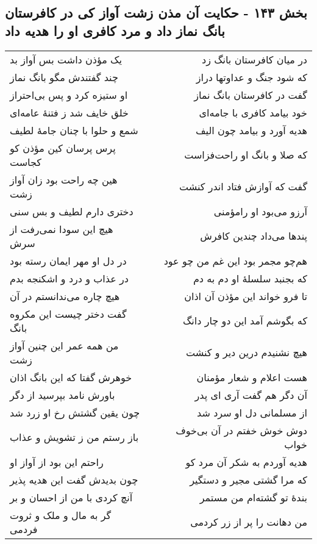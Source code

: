 \begin{center}
\section*{بخش ۱۴۳ - حکایت آن مذن زشت آواز کی در کافرستان بانگ نماز داد و مرد کافری او را هدیه داد}
\label{sec:sh143}
\begin{longtable}{l p{0.5cm} r}
یک مؤذن داشت بس آواز بد
&&
در میان کافرستان بانگ زد
\\
چند گفتندش مگو بانگ نماز
&&
که شود جنگ و عداوتها دراز
\\
او ستیزه کرد و پس بی‌احتراز
&&
گفت در کافرستان بانگ نماز
\\
خلق خایف شد ز فتنهٔ عامه‌ای
&&
خود بیامد کافری با جامه‌ای
\\
شمع و حلوا با چنان جامهٔ لطیف
&&
هدیه آورد و بیامد چون الیف
\\
پرس پرسان کین مؤذن کو کجاست
&&
که صلا و بانگ او راحت‌فزاست
\\
هین چه راحت بود زان آواز زشت
&&
گفت که آوازش فتاد اندر کنشت
\\
دختری دارم لطیف و بس سنی
&&
آرزو می‌بود او رامؤمنی
\\
هیچ این سودا نمی‌رفت از سرش
&&
پندها می‌داد چندین کافرش
\\
در دل او مهر ایمان رسته بود
&&
هم‌چو مجمر بود این غم من چو عود
\\
در عذاب و درد و اشکنجه بدم
&&
که بجنبد سلسلهٔ او دم به دم
\\
هیچ چاره می‌ندانستم در آن
&&
تا فرو خواند این مؤذن آن اذان
\\
گفت دختر چیست این مکروه بانگ
&&
که بگوشم آمد این دو چار دانگ
\\
من همه عمر این چنین آواز زشت
&&
هیچ نشنیدم درین دیر و کنشت
\\
خوهرش گفتا که این بانگ اذان
&&
هست اعلام و شعار مؤمنان
\\
باورش نامد بپرسید از دگر
&&
آن دگر هم گفت آری ای پدر
\\
چون یقین گشتش رخ او زرد شد
&&
از مسلمانی دل او سرد شد
\\
باز رستم من ز تشویش و عذاب
&&
دوش خوش خفتم در آن بی‌خوف خواب
\\
راحتم این بود از آواز او
&&
هدیه آوردم به شکر آن مرد کو
\\
چون بدیدش گفت این هدیه پذیر
&&
که مرا گشتی مجیر و دستگیر
\\
آنچ کردی با من از احسان و بر
&&
بندهٔ تو گشته‌ام من مستمر
\\
گر به مال و ملک و ثروت فردمی
&&
من دهانت را پر از زر کردمی

\end{longtable}
\end{center}
